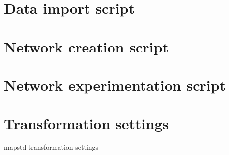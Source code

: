 \documentclass[a4paper, 11pt]{article}
\begin{document}
\section{Data import script}


\pagebreak

\section{Network creation script}


\pagebreak

\section{Network experimentation script}


\pagebreak

\section{Transformation settings}
\begin{table}[h]
\caption{mapstd transformation settings}
\label{table:mapstd}
\end{table}

\end{document}
